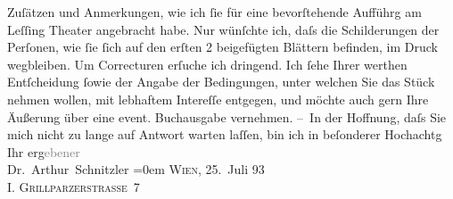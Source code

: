 \begin{ledgroupsized}[t]{13cm}
                    Zuſätzen und Anmerkungen, wie ich ſie für eine bevorſtehende Aufführg am Leſſing Theater angebracht habe. Nur wünſchte
                    ich, daſs die Schilderungen der Perſonen, wie ſie ſich auf den erſten 2
                    beigefügten Blättern befinden, im Druck wegbleiben.\pend
           \pstart
           {\pb}Um Correcturen erſuche ich dringend.\pend
           \pstart
           Ich ſehe Ihrer werthen Entſcheidung ſowie der Angabe der Bedingungen, unter
                    welchen Sie das Stück nehmen wollen, mit
                    lebhaftem Intereſſe entgegen, und möchte auch gern Ihre Äußerung über eine
                    event. Buchausgabe vernehmen.\pend
           \pstart
           – In der Hoffnung, daſs {\pb}Sie mich nicht zu lange auf
                    Antwort warten laſſen, bin ich in beſonderer Hochachtg\pend
           \pstart
           Ihr erg\textcolor{gray}{ebener}{\\[\baselineskip]}\spacefill\mbox{Dr. Arthur Schnitzler}\pend
           \leftskip=0em{}\pstart
           \textsc{Wien}, 25. Juli 93{\\}\textsc{I. Grillparzerstraße 7}\pend
           
         
         \endnumbering{}\end{ledgroupsized}  \newcommand{\dateiname}{L00242}\newcommand{\titel}{Arthur Schnitzler an Samuel Fischer, 25. 7. 1893}\newcommand{\editorInnen}{Martin Anton Müller und Gerd-Hermann Susen}
      